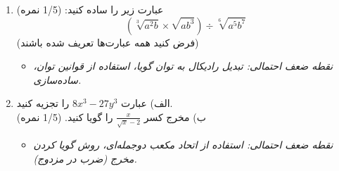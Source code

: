 \documentclass[12pt,a4paper]{article}
\begin{document}
\begin{enumerate}[label=\arabic*., start=6, rightmargin=1em, itemsep=1em]
    \item عبارت زیر را ساده کنید: (1/5 نمره)
    \[
    (\sqrt[3]{a^2b} \times \sqrt{ab^3}) \div \sqrt[6]{a^5b^7}
    \]
    (فرض کنید همه عبارت‌ها تعریف شده باشند)
    \begin{itemize}[label=$\circ$, rightmargin=2em]
        \item \textit{نقطه ضعف احتمالی: تبدیل رادیکال به توان گویا، استفاده از قوانین توان، ساده‌سازی.}
    \end{itemize}

    \item الف) عبارت $8x^3 - 27y^3$ را تجزیه کنید. \\
    ب) مخرج کسر $\frac{x}{\sqrt{x} - 2}$ را گویا کنید. (1/5 نمره)
    \begin{itemize}[label=$\circ$, rightmargin=2em]
        \item \textit{نقطه ضعف احتمالی: استفاده از اتحاد مکعب دوجمله‌ای، روش گویا کردن مخرج (ضرب در مزدوج).}
    \end{itemize}
\end{enumerate}

\hrulefill
\vspace{1em}
\end{document}

